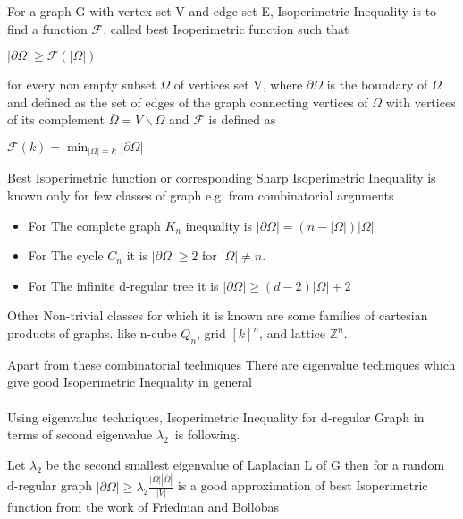 \documentclass[oneside]{book}
\begin{document}
For a graph G with vertex set V and edge set E, Isoperimetric Inequality is to find a function $\mathcal{F}$, called best  Isoperimetric function such that  \begin{center}
  $|\partial \Omega| \geq \mathcal{F}(|\Omega|)$  
\end{center}   
for every non empty subset $\Omega$ of vertices set V, where $\partial \Omega$ is the boundary of $\Omega$  and defined as the set of edges of the graph connecting vertices of $\Omega$ with vertices of its complement $\bar{\Omega} = V \backslash \Omega $ and $\mathcal{F}$ is defined as  \begin{center}
    $\mathscr{F}(k)=\min _{|\Omega|=k}|\partial \Omega|$\par
\end{center} 
 Best Isoperimetric function or corresponding Sharp Isoperimetric Inequality is known only for few classes of graph e.g.
from combinatorial arguments 
\par
\begin{itemize}
    \item For The complete graph $K_{n}$ inequality is $|\partial \Omega|=(n-|\Omega|) | \Omega|$ 
    \item For The cycle $C_{n}$ it is  $|\partial \Omega|\geq 2$ for $|\Omega| \neq n$.
    \item For The infinite d-regular tree it is $|\partial \Omega| \geq(d-2)| \Omega|+2$\par
\end{itemize}
 
  
     
     Other Non-trivial classes for which it is known are some families of cartesian products of graphs. like 
n-cube $Q_{n}$, 
grid $[k]^{n}$,
and lattice $\mathbb{Z}^{n}$.
\par
 Apart from these combinatorial techniques There are eigenvalue techniques which give good Isoperimetric Inequality in general \\\\
 
 Using eigenvalue techniques, 
 Isoperimetric Inequality for d-regular Graph in terms of second eigenvalue $\lambda_2$\ is following. \par
  
 Let $\lambda_{2}$ be the second smallest eigenvalue of Laplacian L of G then for a random d-regular graph $|\partial \Omega| \geq \lambda_{2} \frac{|\Omega||\bar{\Omega}|}{|V|}$  is a good approximation of best Isoperimetric function from the work of Friedman and Bollobas  \par 
     
\end{document}
